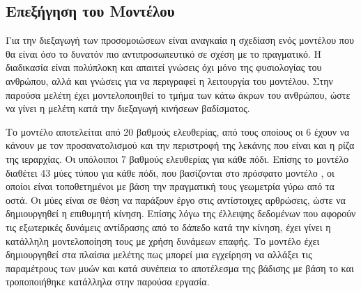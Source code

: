 %

\subsection{Επεξήγηση του Μοντέλου}

Για την διεξαγωγή των προσομοιώσεων είναι αναγκαία η σχεδίαση ενός μοντέλου που θα είναι όσο το δυνατόν πιο αντιπροσωπευτικό σε σχέση με το πραγματικό. Η διαδικασία είναι πολύπλοκη και απαιτεί γνώσεις όχι μόνο της φυσιολογίας του ανθρώπου, αλλά και γνώσεις για να περιγραφεί η λειτουργία του μοντέλου. Στην παρούσα μελέτη έχει μοντελοποιηθεί το τμήμα των κάτω άκρων του ανθρώπου, ώστε να γίνει η μελέτη κατά την διεξαγωγή κινήσεων βαδίσματος.

Το μοντέλο αποτελείται από 20 βαθμούς ελευθερίας, από τους οποίους οι 6 έχουν να κάνουν με τον προσανατολισμού και την περιστροφή της λεκάνης που είναι και η ρίζα της ιεραρχίας. Οι υπόλοιποι 7 βαθμούς ελευθερίας για κάθε πόδι. Επίσης το μοντέλο διαθέτει 43 μύες τύπου  για κάθε πόδι, που βασίζονται στο πρόσφατο μοντέλο , οι οποίοι είναι τοποθετημένοι με βάση την πραγματική τους γεωμετρία γύρω από τα οστά. Οι μύες είναι σε θέση να παράξουν έργο στις αντίστοιχες αρθρώσεις, ώστε να δημιουργηθεί η επιθυμητή κίνηση. Επίσης λόγω της έλλειψης δεδομένων που αφορούν τις εξωτερικές δυνάμεις αντίδρασης από το δάπεδο κατά την κίνηση, έχει γίνει η κατάλληλη μοντελοποίηση τους με χρήση δυνάμεων επαφής. Το μοντέλο έχει δημιουργηθεί στα πλαίσια μελέτης πως μπορεί μια εγχείρηση να αλλάξει τις παραμέτρους των μυών και κατά συνέπεια το αποτέλεσμα της βάδισης με βάση το \cite{delp90} και τροποποιήθηκε κατάλληλα στην παρούσα εργασία.

